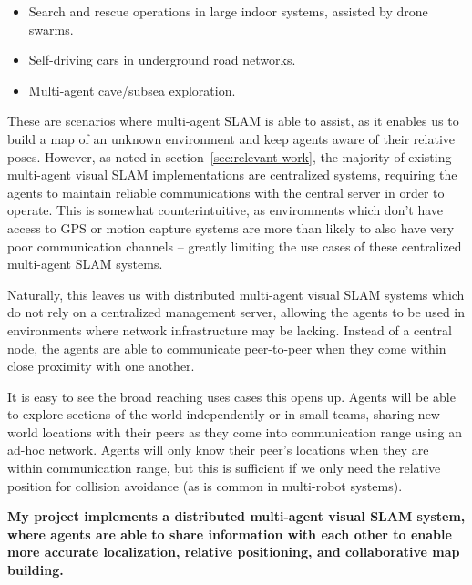 {
    \begin{itemize}[nosep]
        \item Search and rescue operations in large indoor systems, assisted by drone swarms.
        \item Self-driving cars in underground road networks.
        \item Multi-agent cave/subsea exploration.
    \end{itemize}
}

These are scenarios where multi-agent SLAM is able to assist, as it enables us to build a map of an unknown environment and keep agents aware of their relative poses. However, as noted in section~\ref{sec:relevant-work}, the majority of existing multi-agent visual SLAM implementations are centralized systems, requiring the agents to maintain reliable communications with the central server in order to operate. This is somewhat counterintuitive, as environments which don't have access to GPS or motion capture systems are more than likely to also have very poor communication channels -- greatly limiting the use cases of these centralized multi-agent SLAM systems.

Naturally, this leaves us with distributed multi-agent visual SLAM systems which do not rely on a centralized management server, allowing the agents to be used in environments where network infrastructure may be lacking. Instead of a central node, the agents are able to communicate peer-to-peer when they come within close proximity with one another.

It is easy to see the broad reaching uses cases this opens up. Agents will be able to explore sections of the world independently or in small teams, sharing new world locations with their peers as they come into communication range using an ad-hoc network. Agents will only know their peer's locations when they are within communication range, but this is sufficient if we only need the relative position for collision avoidance (as is common in multi-robot systems).

\textbf{My project implements a distributed multi-agent visual SLAM system, where agents are able to share information with each other to enable more accurate localization, relative positioning, and collaborative map building.}

